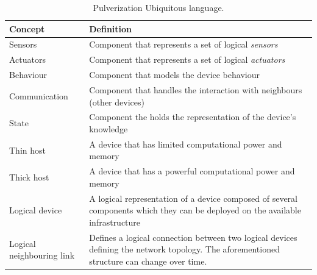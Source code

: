 \begin{table}
	\begin{tabularx}{\textwidth}{l X}
		\toprule
		\textbf{Concept}          & \textbf{Definition}                                                                                             \\
		\midrule
		Sensors                   & Component that represents a set of logical \emph{sensors}                                                       \\
		Actuators                 & Component that represents a set of logical \emph{actuators}                                                     \\
		Behaviour                 & Component that models the device behaviour                                                                      \\
		Communication             & Component that handles the interaction with neighbours (other devices)                                          \\
		State                     & Component the holds the representation of the device's knowledge                                                \\
		Thin host                 & A device that has limited computational power and memory                                                        \\
		Thick host                & A device that has a powerful computational power and memory                                                     \\
		Logical device            & A logical representation of a device composed of several components which they can be deployed on the available
		infrastructure                                                                                                                              \\
		Logical neighbouring link & Defines a logical connection between two logical devices defining the network topology.
		The aforementioned structure can change over time.                                                                                          \\
		\bottomrule
	\end{tabularx}
	\caption{Pulverization Ubiquitous language.}
	\label{tab:ubiquitous-language}
\end{table}

